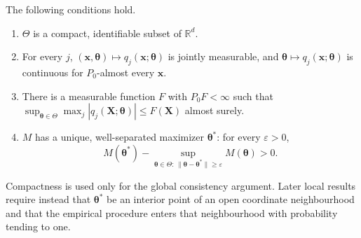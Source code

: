 \begin{assumption}
\label{ass:basic-criterion}
The following conditions hold.
\begin{enumerate}
\item $\Theta$ is a compact, identifiable subset of $\mathbb R^d$.
 \item For every $j$, $(\mathbf{x},\boldsymbol{\theta})\mapsto q_j(\mathbf{x};\boldsymbol{\theta})$ is jointly
 measurable, and $\boldsymbol{\theta}\mapsto q_j(\mathbf{x};\boldsymbol{\theta})$ is continuous for
 $P_0$-almost every $\mathbf{x}$.
 \item There is a measurable function $F$ with $P_0F<\infty$ such that
 $\sup_{\boldsymbol{\theta}\in\Theta}\max_j|q_j(\mathbf{X};\boldsymbol{\theta})|\leq F(\mathbf{X})$ almost surely.
 \item $M$ has a unique, well-separated maximizer $\boldsymbol{\theta}^*$: for every
 $\varepsilon>0$,
 \[
  M(\boldsymbol{\theta}^*)-
  \sup_{\boldsymbol{\theta}\in\Theta:\,\|\boldsymbol{\theta}-\boldsymbol{\theta}^*\|\geq\varepsilon}M(\boldsymbol{\theta})>0.
 \]
\end{enumerate}
\end{assumption}

Compactness is used only for the global consistency argument.  Later local
results require instead that $\boldsymbol{\theta}^*$ be an interior point of an open
coordinate neighbourhood and that the empirical procedure enters that
neighbourhood with probability tending to one.

